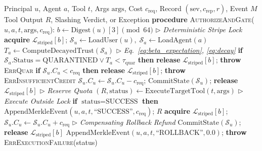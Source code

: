 \documentclass[manuscript, screen, review]{jair}
\begin{document}
\begin{algorithm}[!t]
\caption{DualTrust Multi-Agent Governance Runtime Lifecycle}
\label{alg:lifecycle}
\label{alg:gate}
\label{alg:slashing}
\label{alg:merkle}
\footnotesize
\begin{algorithmic}[1]
\REQUIRE Principal $u$, Agent $a$, Tool $t$, Args $\text{args}$, Cost $c_{\text{req}}$, Record $(\text{sev}, c_{\text{rep}}, r)$, Event $M$
\ENSURE Tool Output $R$, Slashing Verdict, or Exception
\vspace{2pt}
\STATE \textbf{procedure} \textsc{AuthorizeAndGate}($u, a, t, \text{args}, c_{\text{req}}$):
\STATE \quad $b \leftarrow \text{Digest}(u)[3] \pmod{64}$ \hfill $\triangleright$ \textit{Deterministic Stripe Lock}
\STATE \quad \textbf{acquire} $\mathcal{L}_{\text{striped}}[b]$; \;\; $\mathcal{S}_u \leftarrow \text{LoadUser}(u), \; \mathcal{S}_a \leftarrow \text{LoadAgent}(a)$
\STATE \quad $T_a \leftarrow \text{ComputeDecayedTrust}(\mathcal{S}_a)$ \hfill $\triangleright$ \textit{Eq.~\eqref{eq:beta_expectation}, \eqref{eq:decay}}
\STATE \quad \textbf{if} $\mathcal{S}_a.\text{Status} = \text{QUARANTINED} \lor T_a < \tau_{\text{quar}}$ \textbf{then} \textbf{release} $\mathcal{L}_{\text{striped}}[b]$; \textbf{throw} \textsc{ErrQuar}
\STATE \quad \textbf{if} $\mathcal{S}_u.C_u < c_{\text{req}}$ \textbf{then} \textbf{release} $\mathcal{L}_{\text{striped}}[b]$; \textbf{throw} \textsc{ErrInsufficientCredit}
\STATE \quad $\mathcal{S}_u.C_u \leftarrow \mathcal{S}_u.C_u - c_{\text{req}}$; \;\; $\text{CommitState}(\mathcal{S}_u)$; \;\; \textbf{release} $\mathcal{L}_{\text{striped}}[b]$ \hfill $\triangleright$ \textit{Reserve Quota}
\STATE \quad $(R, \text{status}) \leftarrow \text{ExecuteTargetTool}(t, \text{args})$ \hfill $\triangleright$ \textit{Execute Outside Lock}
\STATE \quad \textbf{if} $\text{status} = \text{SUCCESS}$ \textbf{then} $\text{AppendMerkleEvent}(u, a, t, \text{``SUCCESS''}, c_{\text{req}})$; \RETURN $R$
\STATE \quad \textbf{acquire} $\mathcal{L}_{\text{striped}}[b]$; \;\; $\mathcal{S}_u.C_u \leftarrow \mathcal{S}_u.C_u + c_{\text{req}}$ \hfill $\triangleright$ \textit{Compensating Rollback Refund}
\STATE \quad $\text{CommitState}(\mathcal{S}_u)$; \;\; \textbf{release} $\mathcal{L}_{\text{striped}}[b]$
\STATE \quad $\text{AppendMerkleEvent}(u, a, t, \text{``ROLLBACK''}, 0.0)$; \;\; \textbf{throw} \textsc{ErrExecutionFailure}(status)


\end{algorithmic}
\end{algorithm}
\end{document}
